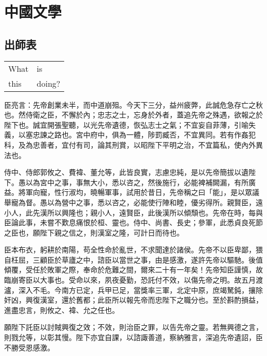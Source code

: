 
\chapter{中國文學}

\section{出師表}

\begingroup
\centering

\begin{tabular}{ll}
What & is \\
this & doing? \\
\end{tabular}
\captionsetup{type=table}
\label{tbl:nicetablelesstable}
\endgroup

臣亮言：先帝創業未半，而中道崩殂。今天下三分，益州疲弊，此誠危急存亡之秋也。然侍衛之臣，不懈於內；忠志之士，忘身於外者，蓋追先帝之殊遇，欲報之於陛下也。誠宜開張聖聽，以光先帝遺德，恢弘志士之氣；不宜妄自菲薄，引喻失義，以塞忠諫之路也。宮中府中，俱為一體，陟罰臧否，不宜異同。若有作姦犯科，及為忠善者，宜付有司，論其刑賞，以昭陛下平明之治，不宜篇私，使內外異法也。\par

侍中、侍郎郭攸之、費褘、董允等，此皆良實，志慮忠純，是以先帝簡拔以遺陛下。愚以為宮中之事，事無大小，悉以咨之，然後施行，必能裨補闕漏，有所廣益。將軍向寵，性行淑均，曉暢軍事，試用於昔日，先帝稱之曰「能」，是以眾議舉寵為督。愚以為營中之事，悉以咨之，必能使行陣和睦，優劣得所。親賢臣，遠小人，此先漢所以興隆也；親小人，遠賢臣，此後漢所以傾頹也。先帝在時，每與臣論此事，未嘗不歎息痛恨於桓、靈也。侍中、尚書、長史；參軍，此悉貞良死節之臣也，願陛下親之信之，則漢室之隆，可計日而待也。

臣本布衣，躬耕於南陽，苟全性命於亂世，不求聞達於諸侯。先帝不以臣卑鄙，猥自枉屈，三顧臣於草廬之中，諮臣以當世之事，由是感激，遂許先帝以驅馳。後值傾覆，受任於敗軍之際，奉命於危難之間，爾來二十有一年矣！先帝知臣謹慎，故臨崩寄臣以大事也。受命以來，夙夜憂勤，恐託付不效，以傷先帝之明。故五月渡瀘，深入不毛。今南方已定，兵甲已足，當獎率三軍，北定中原，庶竭駑鈍，攘除奸凶，興復漢室，還於舊都；此臣所以報先帝而忠陛下之職分也。至於斟酌損益，進盡忠言，則攸之、褘、允之任也。

願陛下託臣以討賊興復之效；不效，則治臣之罪，以告先帝之靈。若無興德之言，則戮允等，以彰其慢。陛下亦宜自課，以諮諏善道，察納雅言，深追先帝遺詔，臣不勝受恩感激。

